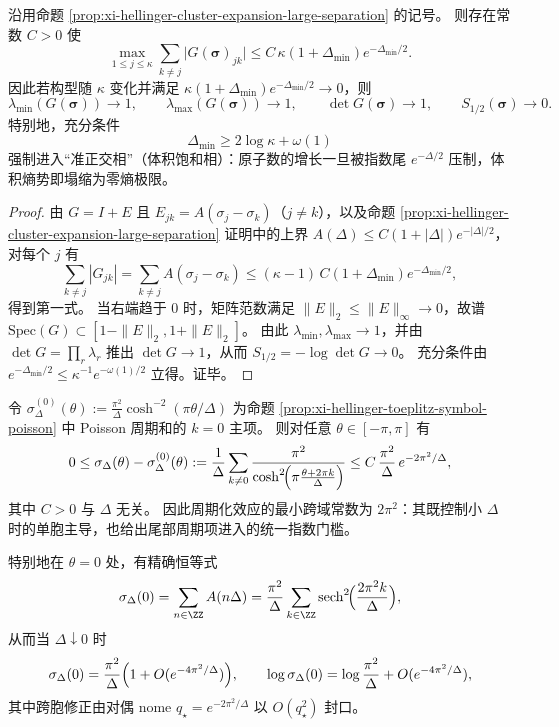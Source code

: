\begin{corollary}\label{cor:xi-hellinger-quasi-orthogonal-phase}
沿用命题 \ref{prop:xi-hellinger-cluster-expansion-large-separation} 的记号。
则存在常数 \(C>0\) 使
\[
\max_{1\le j\le \kappa}\sum_{k\neq j}\bigl|G(\boldsymbol{\sigma})_{jk}\bigr|
\le C\,\kappa(1+\Delta_{\min})e^{-\Delta_{\min}/2}.
\]
因此若构型随 \(\kappa\) 变化并满足 \(\kappa(1+\Delta_{\min})e^{-\Delta_{\min}/2}\to 0\)，则
\[
\lambda_{\min}(G(\boldsymbol{\sigma}))\to 1,\qquad
\lambda_{\max}(G(\boldsymbol{\sigma}))\to 1,\qquad
\det G(\boldsymbol{\sigma})\to 1,\qquad
S_{1/2}(\boldsymbol{\sigma})\to 0.
\]
特别地，充分条件
\[
\Delta_{\min}\ge 2\log\kappa+\omega(1)
\]
强制进入“准正交相”（体积饱和相）：原子数的增长一旦被指数尾 \(e^{-\Delta/2}\) 压制，体积熵势即塌缩为零熵极限。
\end{corollary}
\begin{proof}
由 \(G=I+E\) 且 \(E_{jk}=A(\sigma_j-\sigma_k)\)（\(j\neq k\)），以及命题 \ref{prop:xi-hellinger-cluster-expansion-large-separation} 证明中的上界
\(
A(\Delta)\le C(1+|\Delta|)e^{-|\Delta|/2}
\)，
对每个 \(j\) 有
\[
\sum_{k\neq j}|G_{jk}|=\sum_{k\neq j}A(\sigma_j-\sigma_k)\le (\kappa-1)\,C(1+\Delta_{\min})e^{-\Delta_{\min}/2},
\]
得到第一式。
当右端趋于 \(0\) 时，矩阵范数满足 \(\|E\|_2\le \|E\|_\infty\to 0\)，故谱 \(\mathrm{Spec}(G)\subset [1-\|E\|_2,1+\|E\|_2]\)。
由此 \(\lambda_{\min},\lambda_{\max}\to 1\)，并由 \(\det G=\prod_r\lambda_r\) 推出 \(\det G\to 1\)，从而 \(S_{1/2}=-\log\det G\to 0\)。
充分条件由 \(e^{-\Delta_{\min}/2}\le \kappa^{-1}e^{-\omega(1)/2}\) 立得。证毕。
\end{proof}

\begin{remark}\label{rem:xi-hellinger-toeplitz-periodization-constant-2pi2}
令 \(\sigma_\Delta^{(0)}(\theta):=\frac{\pi^2}{\Delta}\cosh^{-2}(\pi\theta/\Delta)\) 为命题 \ref{prop:xi-hellinger-toeplitz-symbol-poisson} 中 Poisson 周期和的 \(k=0\) 主项。
则对任意 \(\theta\in[-\pi,\pi]\) 有
\[
0\le \sigma_\Delta(\theta)-\sigma_\Delta^{(0)}(\theta)
:=\frac{1}{\Delta}\sum_{k\neq 0}\frac{\pi^{2}}{\cosh^{2}\!\Bigl(\pi\frac{\theta+2\pi k}{\Delta}\Bigr)}
\le C\,\frac{\pi^{2}}{\Delta}\,e^{-2\pi^{2}/\Delta},
\]
其中 \(C>0\) 与 \(\Delta\) 无关。
因此周期化效应的最小跨域常数为 \(2\pi^2\)：其既控制小 \(\Delta\) 时的单胞主导，也给出尾部周期项进入的统一指数门槛。
\par
特别地在 \(\theta=0\) 处，有精确恒等式
\[
\sigma_\Delta(0)=\sum_{n\in\ZZ}A(n\Delta)
=\frac{\pi^{2}}{\Delta}\sum_{k\in\ZZ}\mathrm{sech}^{2}\!\Bigl(\frac{2\pi^{2}k}{\Delta}\Bigr),
\]
从而当 \(\Delta\downarrow 0\) 时
\[
\sigma_\Delta(0)=\frac{\pi^{2}}{\Delta}\Bigl(1+O(e^{-4\pi^{2}/\Delta})\Bigr),
\qquad
\log\sigma_\Delta(0)=\log\frac{\pi^{2}}{\Delta}+O(e^{-4\pi^{2}/\Delta}),
\]
其中跨胞修正由对偶 nome \(q_\star=e^{-2\pi^{2}/\Delta}\) 以 \(O(q_\star^{2})\) 封口。
\end{remark}

